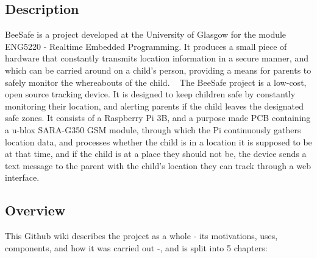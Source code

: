 \subsection*{Description}

Bee\+Safe is a project developed at the University of Glasgow for the module E\+N\+G5220 -\/ Realtime Embedded Programming. It produces a small piece of hardware that constantly transmits location information in a secure manner, and which can be carried around on a child’s person, providing a means for parents to safely monitor the whereabouts of the child. ~\newline
 The Bee\+Safe project is a low-\/cost, open source tracking device. It is designed to keep children safe by constantly monitoring their location, and alerting parents if the child leaves the designated safe zones. It consists of a Raspberry Pi 3B, and a purpose made P\+CB containing a u-\/blox S\+A\+R\+A-\/\+G350 G\+SM module, through which the Pi continuously gathers location data, and processes whether the child is in a location it is supposed to be at that time, and if the child is at a place they should not be, the device sends a text message to the parent with the child’s location they can track through a web interface.

\subsection*{Overview}

This Github wiki describes the project as a whole -\/ its motivations, uses, components, and how it was carried out -\/, and is split into 5 chapters\+: ~\newline

